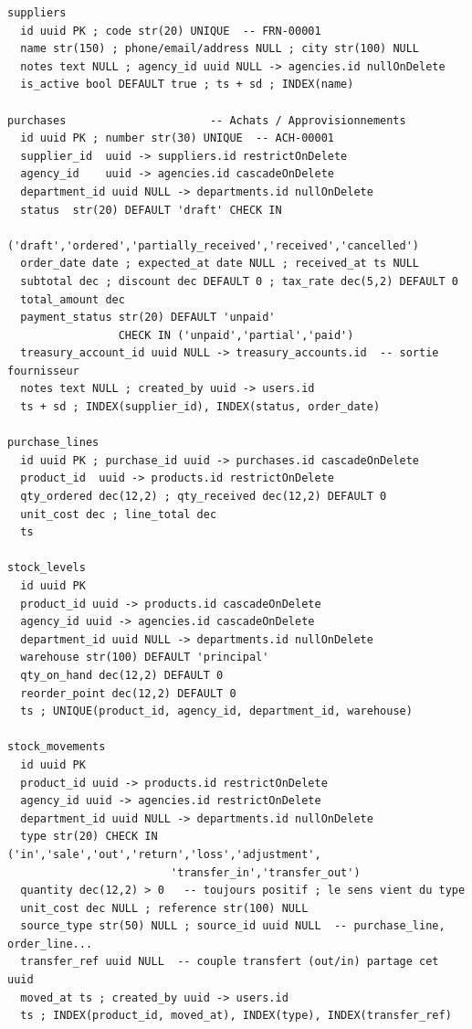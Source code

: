\documentclass[11pt,a4paper]{article}
\begin{document}
\begin{lstlisting}
suppliers
  id uuid PK ; code str(20) UNIQUE  -- FRN-00001
  name str(150) ; phone/email/address NULL ; city str(100) NULL
  notes text NULL ; agency_id uuid NULL -> agencies.id nullOnDelete
  is_active bool DEFAULT true ; ts + sd ; INDEX(name)

purchases                      -- Achats / Approvisionnements
  id uuid PK ; number str(30) UNIQUE  -- ACH-00001
  supplier_id  uuid -> suppliers.id restrictOnDelete
  agency_id    uuid -> agencies.id cascadeOnDelete
  department_id uuid NULL -> departments.id nullOnDelete
  status  str(20) DEFAULT 'draft' CHECK IN
          ('draft','ordered','partially_received','received','cancelled')
  order_date date ; expected_at date NULL ; received_at ts NULL
  subtotal dec ; discount dec DEFAULT 0 ; tax_rate dec(5,2) DEFAULT 0
  total_amount dec
  payment_status str(20) DEFAULT 'unpaid'
                 CHECK IN ('unpaid','partial','paid')
  treasury_account_id uuid NULL -> treasury_accounts.id  -- sortie fournisseur
  notes text NULL ; created_by uuid -> users.id
  ts + sd ; INDEX(supplier_id), INDEX(status, order_date)

purchase_lines
  id uuid PK ; purchase_id uuid -> purchases.id cascadeOnDelete
  product_id  uuid -> products.id restrictOnDelete
  qty_ordered dec(12,2) ; qty_received dec(12,2) DEFAULT 0
  unit_cost dec ; line_total dec
  ts

stock_levels
  id uuid PK
  product_id uuid -> products.id cascadeOnDelete
  agency_id uuid -> agencies.id cascadeOnDelete
  department_id uuid NULL -> departments.id nullOnDelete
  warehouse str(100) DEFAULT 'principal'
  qty_on_hand dec(12,2) DEFAULT 0
  reorder_point dec(12,2) DEFAULT 0
  ts ; UNIQUE(product_id, agency_id, department_id, warehouse)

stock_movements
  id uuid PK
  product_id uuid -> products.id restrictOnDelete
  agency_id uuid -> agencies.id restrictOnDelete
  department_id uuid NULL -> departments.id nullOnDelete
  type str(20) CHECK IN ('in','sale','out','return','loss','adjustment',
                         'transfer_in','transfer_out')
  quantity dec(12,2) > 0   -- toujours positif ; le sens vient du type
  unit_cost dec NULL ; reference str(100) NULL
  source_type str(50) NULL ; source_id uuid NULL  -- purchase_line, order_line...
  transfer_ref uuid NULL  -- couple transfert (out/in) partage cet uuid
  moved_at ts ; created_by uuid -> users.id
  ts ; INDEX(product_id, moved_at), INDEX(type), INDEX(transfer_ref)


\end{lstlisting}
\end{document}
